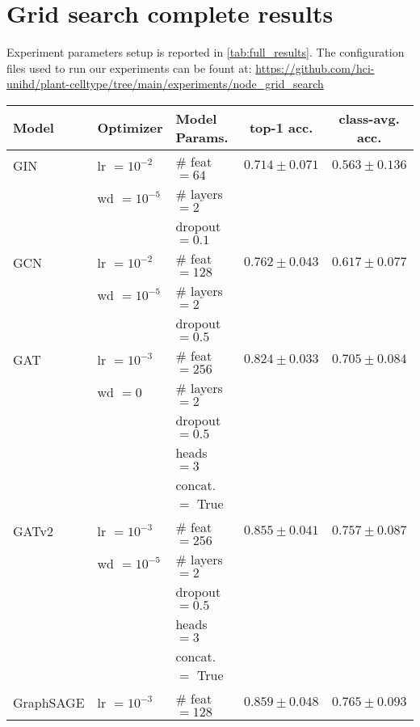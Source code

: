 \documentclass[10pt,twocolumn,letterpaper]{article}
\begin{document}
\section{Grid search complete results}
\label{suppl:sec4}
Experiment parameters setup is reported in \cref{tab:full_results}. The configuration files used to run our experiments can be fount at: \url{https://github.com/hci-unihd/plant-celltype/tree/main/experiments/node_grid_search}
\begin{table*}[h]
  \centering
  \begin{tabular}{@{}lllcc@{}}
    \toprule
    Model & Optimizer     & Model Params.  & top-1 acc. & class-avg. acc.\\
    \midrule
    GIN \cite{xu2018powerful}  & lr $=10^{-2}$ & \# feat $= 64$ & $0.714 \pm 0.071$ & $0.563 \pm 0.136$ \\
          & wd $=10^{-5}$ & \# layers $= 2$ &\\
          &               & dropout $= 0.1$   &\\
    \midrule
    GCN  \cite{kipf2016semi} & lr $=10^{-2}$ & \# feat $= 128$ & $0.762 \pm 0.043$ & $0.617 \pm 0.077$ \\
          & wd $=10^{-5}$    & \# layers $= 2$ &\\
          &               & dropout $= 0.5$   &\\
    \midrule
    GAT \cite{velickovic2018graph}  & lr $=10^{-3}$ & \# feat $= 256$ &$0.824 \pm 0.033$ & $0.705 \pm 0.084$ \\
          & wd $=0$ & \# layers $= 2$ &\\
          &               & dropout $= 0.5$   &\\
          &               & heads $= 3$       &\\
          &               & concat. $=$ True  &\\
    \midrule
    GATv2 \cite{brody2021attentive} & lr $=10^{-3}$ & \# feat $= 256$ &$0.855 \pm 0.041$ & $0.757 \pm 0.087$ \\
          & wd $=10^{-5}$       & \# layers $= 2$ &\\
          &               & dropout $= 0.5$   &\\
          &               & heads $= 3$       &\\
          &               & concat. $=$ True  &\\
    \midrule
    GraphSAGE \cite{hamilton2017inductive} & lr $=10^{-3}$ & \# feat $= 128$ &$0.859 \pm 0.048$ & $0.765 \pm 0.093$ \\

\end{tabular}
\end{table*}
\end{document}
